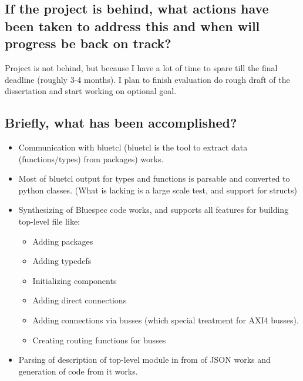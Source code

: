 \documentclass[14pt]{article}
\begin{document}
    \subsection{If the project is behind, what actions have been taken to address this and when will progress be back on track?}
        Project is not behind, but because I have a lot of time to spare till the final deadline (roughly 3-4 months). I plan to finish evaluation do rough draft of the dissertation and start working on optional goal. 
    \subsection{Briefly, what has been accomplished?}
    \begin{itemize}
        \item Communication with bluetcl (bluetcl is the tool to extract data (functions/types) from packages) works. 
        \item Most of bluetcl output for types and functions is parsable and converted to python classes. (What is lacking is a large scale test, and support for structs)
        \item Synthesizing of Bluespec code works, and supports all features for building top-level file like:
        \begin{itemize}
            \item Adding packages
            \item Adding typedefs
            \item Initializing components
            \item Adding direct connections
            \item Adding connections via busses (which special treatment for AXI4 busses).
            \item Creating routing functions for busses
        \end{itemize}
        \item Parsing of description of top-level module in from of JSON works and generation of code from it works.
    \end{itemize}
        
\end{document}
